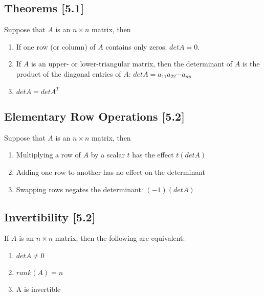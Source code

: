\documentclass[a4paper,9pt]{extarticle}
\begin{document}
\begin{multicols*}{2}

\subsection{Theorems [5.1]}
Suppose that $A$ is an $n \times n$ matrix, then
\begin{enumerate}[label=\bfseries (\arabic*)] \itemsep0pt \parskip0pt 
    \item If one row (or column) of $A$ contains only zeros: $det A = 0$.
    \item If $A$ is an upper- or lower-triangular matrix, then the determinant of $A$ is the product of the diagonal entries of $A$: $det A = a_{11} a_{22} \cdots a_{nn}$
    \item $det A = det A^T$
\end{enumerate}


\subsection{Elementary Row Operations [5.2]}
Suppose that $A$ is an $n \times n$ matrix, then
\begin{enumerate}[label=\bfseries (\arabic*)] \itemsep0pt \parskip0pt 
    \item Multiplying a row of $A$ by a scalar $t$ has the effect $t(det A)$
    \item Adding one row to another has no effect on the determinant
    \item Swapping rows negates the determinant: $(-1)(det A)$
\end{enumerate}


\subsection{Invertibility [5.2]}
If $A$ is an $n \times n$ matrix, then the following are equivalent:
\begin{enumerate}[label=\bfseries (\arabic*)] \itemsep0pt \parskip0pt 
    \item $det A \neq 0$
    \item $rank(A) = n$
    \item A is invertible
\end{enumerate}



\end{multicols*}
\end{document}
